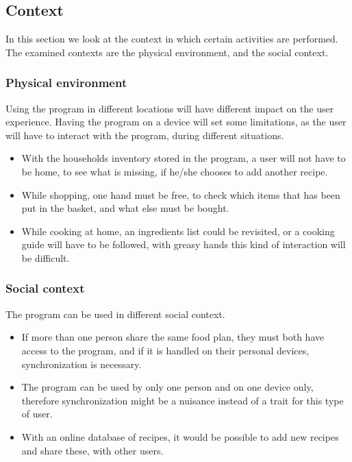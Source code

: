 \subsection{Context}
In this section we look at the context in which certain activities are performed. The examined contexts are the physical environment, and the social context.

\subsubsection{Physical environment}
Using the program in different locations will have different impact on the user experience. Having the program on a device will set some limitations, as the user will have to interact with the program, during different situations.
\begin{itemize}
\item With the households inventory stored in the program, a user will not have to be home, to see what is missing, if he/she chooses to add another recipe.
\item While shopping, one hand must be free, to check which items that has been put in the basket, and what else must be bought.
\item While cooking at home, an ingredients list could be revisited, or a cooking guide will have to be followed, with greasy hands this kind of interaction will be difficult.
\end{itemize}

\subsubsection{Social context}
The program can be used in different social context.
\begin{itemize}
\item If more than one person share the same food plan, they must both have access to the program, and if it is handled on their personal devices, synchronization is necessary.
\item The program can be used by only one person and on one device only, therefore synchronization might be a nuisance instead of a trait for this type of user.
\item With an online database of recipes, it would be possible to add new recipes and share these, with other users.
\end{itemize}
